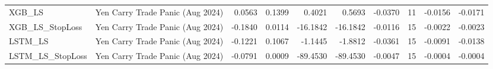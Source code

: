 \begin{tabular}{llrrrrrrrr}
\cline{1-10}
XGB\_LS & Yen Carry Trade Panic (Aug 2024) & 0.0563 & 0.1399 & 0.4021 & 0.5693 & -0.0370 & 11 & -0.0156 & -0.0171 \\
\cline{1-10}
XGB\_LS\_StopLoss & Yen Carry Trade Panic (Aug 2024) & -0.1840 & 0.0114 & -16.1842 & -16.1842 & -0.0116 & 15 & -0.0022 & -0.0023 \\
\cline{1-10}
LSTM\_LS & Yen Carry Trade Panic (Aug 2024) & -0.1221 & 0.1067 & -1.1445 & -1.8812 & -0.0361 & 15 & -0.0091 & -0.0138 \\
\cline{1-10}
LSTM\_LS\_StopLoss & Yen Carry Trade Panic (Aug 2024) & -0.0791 & 0.0009 & -89.4530 & -89.4530 & -0.0047 & 15 & -0.0004 & -0.0004 \\
\cline{1-10}
\bottomrule
\end{tabular}
